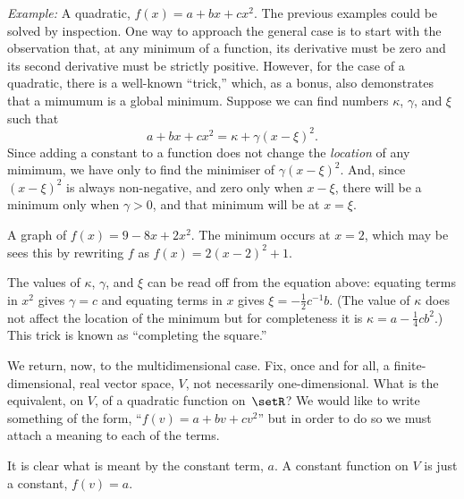 \documentclass[10pt, a4paper]{article}
\newcommand{\eg}{\emph{Example:}}
\begin{document}
\eg{} A quadratic, $f(x) = a + bx + cx^2$. The previous examples could
be solved by inspection. One way to approach the general case is to
start with the observation that, at any minimum of a function, its
derivative must be zero and its second derivative must be strictly
positive.
However, for the case of a quadratic, there is a well-known “trick,”
which, as a bonus, also demonstrates that a mimumum is a global
minimum. Suppose we can find numbers $\kappa$, $\gamma$, and $\xi$ such that
\begin{equation}
  a + bx + cx^2 = \kappa + \gamma{(x - \xi)}^2.
\label{eq:completing-the-square}
\end{equation}
Since adding a constant to a function does not change the
\emph{location} of any mimimum, we have only to find the minimiser of
$\gamma{(x-\xi)}^2$. And, since ${(x-\xi)}^2$ is always non-negative, and zero
only when $x-\xi$, there will be a minimum only when $\gamma >0$, and that
minimum will be at $x=\xi$.
\begin{marginfigure}
  \begin{center}
  \end{center}
\caption{A graph of $f(x) = 9 - 8x + 2x^2$. The minimum occurs at
  $x=2$, which may be sees this by rewriting $f$ as $f(x) =
  2{(x-2)}^2+1$.\label{fig:quadratic}}
\end{marginfigure}
The values of $\kappa$, $\gamma$, and $\xi$ can be read off from the equation
above: equating terms in $x^2$ gives $\gamma=c$ and equating terms in
$x$ gives $\xi=-\frac{1}{2}c^{-1}b$. (The value of $\kappa$ does not affect
the location of the minimum but for completeness it is
$\kappa=a-\frac{1}{4}cb^2$.) This trick is known as “completing the
square.”

We return, now, to the multidimensional case. Fix, once and for all, a
finite-dimensional, real vector space, $V$, not necessarily
one-dimensional. What is the equivalent, on $V$, of a quadratic
function on~$\setR$? We would like to write something of the form,
“$f(v) = a+bv+cv^2$” but in order to do so we must attach a meaning to
each of the terms.

It is clear what is meant by the constant term, $a$. A constant
function on $V$ is just a constant, $f(v)=a$.
\end{document}
